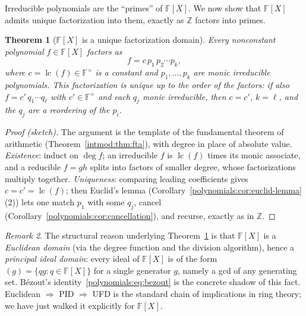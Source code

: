 \documentclass[11pt,a4paper]{article}
\newtheorem{theorem}{Theorem}[section]
\theoremstyle{definition}
\theoremstyle{remark}
\newtheorem{remark}[theorem]{Remark}
\newcommand{\Z}{\ensuremath{\mathbb{Z}}}
\newcommand{\F}{\ensuremath{\mathbb{F}}}
\begin{document}
Irreducible polynomials are the ``primes'' of \(\F[X]\). We now show that
\(\F[X]\) admits unique factorization into them, exactly as \(\Z\) factors into
primes.

\begin{theorem}[{\(\F[X]\) is a unique factorization domain}]
\label{polynomials:thm:ufd}
Every nonconstant polynomial \(f \in \F[X]\) factors as
\begin{equation}\label{polynomials:eq:factorization}
  f = c\, p_1\, p_2 \cdots p_k,
\end{equation}
where \(c = \operatorname{lc}(f) \in \F^\times\) is a constant and
\(p_1, \dots, p_k\) are monic irreducible polynomials. This factorization is
unique up to the order of the factors: if also \(f = c'\, q_1 \cdots q_\ell\)
with \(c' \in \F^\times\) and each \(q_j\) monic irreducible, then \(c = c'\),
\(k = \ell\), and the \(q_j\) are a reordering of the \(p_i\).
\end{theorem}

\begin{proof}[Proof (sketch)]
The argument is the template of the fundamental theorem of arithmetic
(Theorem~\ref{intmod:thm:fta}), with degree in place of absolute value.
\emph{Existence}: induct on \(\deg f\); an irreducible \(f\) is
\(\operatorname{lc}(f)\) times its monic associate, and a reducible \(f = gh\)
splits into factors of smaller degree, whose factorizations multiply together.
\emph{Uniqueness}: comparing leading coefficients gives
\(c = c' = \operatorname{lc}(f)\); then Euclid's lemma
(Corollary~\ref{polynomials:cor:euclid-lemma}(2)) lets one match \(p_1\) with
some \(q_j\), cancel (Corollary~\ref{polynomials:cor:cancellation}), and recurse,
exactly as in \(\Z\).
\end{proof}

\begin{remark}\label{polynomials:rem:pid}
The structural reason underlying Theorem~\ref{polynomials:thm:ufd} is that
\(\F[X]\) is a \emph{Euclidean domain} (via the degree function and the division
algorithm), hence a \emph{principal ideal domain}: every ideal of \(\F[X]\) is of
the form \((g) = \{q g : q \in \F[X]\}\) for a single generator \(g\), namely a
gcd of any generating set. B\'ezout's identity~\eqref{polynomials:eq:bezout} is
the concrete shadow of this fact. Euclidean \(\Rightarrow\) PID \(\Rightarrow\)
UFD is the standard chain of implications in ring theory; we have just walked it
explicitly for \(\F[X]\).
\end{remark}
\end{document}
